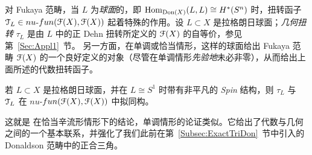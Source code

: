 对 Fukaya 范畴，当 $L$ 为\emph{球面}的，即 $\mathrm{Hom}_{\mathrm{Don}(X)}(L,L) \cong H^*(S^n)$ 时，扭转函子 $\EuScript{T}_L \in nu$-$fun(\EuScript{F}(X),\EuScript{F}(X))$ 起着特殊的作用。设 $L\subset X$ 是拉格朗日球面；\emph{几何扭转} $\tau_L$ 是由 $L$ 中的正 Dehn 扭转所定义的 $\EuScript{F}(X)$ 的自等价，参见第~\ref{Sec:Appl1}~节。
另一方面，在单调或恰当情形，这样的球面给出 Fukaya 范畴 $\EuScript{F}(X)$ 的一个良好定义的对象（尽管在单调情形\emph{先验地}未必非零），从而给出上面所述的代数扭转函子。

\begin{Theorem}[Seidel] \label{Prop:twists}
若 $L\subset X$ 是拉格朗日球面，并在 $L \cong S^1$ 时带有非平凡的 \emph{Spin} 结构，则 $\tau_L$ 与 $\EuScript{T}_L$ 在 $nu$-$fun(\EuScript{F}(X),\EuScript{F}(X))$ 中拟同构。
\end{Theorem}

这就是 \cite[Corollary 17.17]{FCPLT} 在恰当辛流形情形下的结论，单调情形的论证类似。它给出了代数与几何之间的一个基本联系，并强化了我们此前在第~\ref{Subsec:ExactTriDon}~节中引入的 Donaldson 范畴中的正合三角。
